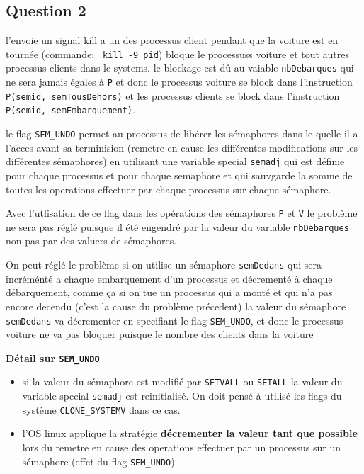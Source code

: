\subsection{Question 2}
l'envoie un signal kill a un des processus client pendant que la
voiture est en tournée (commande: \texttt{ kill -9 pid}) bloque le processuss
voiture et tout autres processus clients dans le systems. le
blockage est dû au vaiable \texttt{nbDebarques} qui ne sera jamais égales à
\texttt{P} et donc le processus voiture se block dans l'instruction
\texttt{P(semid, semTousDehors)} et les processus clients se block dans
l'instruction \texttt{P(semid, semEmbarquement)}.

le flag \texttt{SEM\_UNDO} permet au processus de libérer les sémaphores dans le
quelle il a l'acces avant sa terminision  (remetre en cause les
différentes modifications sur les différentes sémaphores) en utilisant une variable special
\texttt{semadj} qui est définie pour chaque processus et pour chaque semaphore
et qui sauvgarde la somme de toutes les operations effectuer par chaque
processus sur chaque sémaphore.

Avec l'utlisation de ce flag dans les opérations des sémaphores
\texttt{P} et \texttt{V} le problème ne sera pas réglé puisque il été
engendré par la valeur du variable \texttt{nbDebarques} non pas par des valuers
de sémaphores.

On peut réglé le problème si on utilise un sémaphore \texttt{semDedans} qui sera
incréménté a chaque embarquement d'un processus et décrementé à chaque
débarquement, comme ça si on tue un processus qui a monté et qui n'a pas encore
decendu (c'est la cause du problème précedent) la valeur du sémaphore
\texttt{semDedans} va décrementer en specifiant le flag \texttt{SEM\_UNDO}, et
donc le processus voiture ne va pas bloquer puisque le nombre des clients dans
la voiture 

\textbf{Détail sur \texttt{SEM\_UNDO}}

\begin{itemize}
\item
  si la valeur du sémaphore est modifié par \texttt{SETVALL} ou \texttt{SETALL} la
  valeur du variable special \texttt{semadj} est reinitialisé. On doit pensé à
  utilisé les flags du système \texttt{CLONE\_SYSTEMV} dans ce cas.\\

\item
  l'OS linux applique la stratégie \textbf{décrementer la valeur tant que possible} lors du
  remetre en cause des operations effectuer par un processus sur un sémaphore
  (effet du flag \texttt{SEM\_UNDO}).
\end{itemize}

